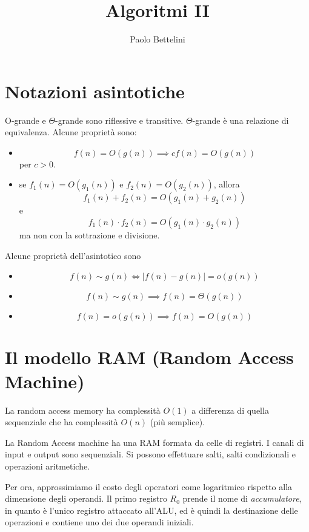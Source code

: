 \documentclass[a4paper]{article}
\title{Algoritmi II}
\author{Paolo Bettelini}
\date{}
\begin{document}
\maketitle
\tableofcontents

\section{Notazioni asintotiche}

O-grande e \(\Theta\)-grande sono riflessive e transitive.
\(\Theta\)-grande è una relazione di equivalenza.
Alcune proprietà sono:
\begin{itemize}
    \item \[
        f(n) = O(g(n)) \implies cf(n) = O(g(n))
    \]
    per \(c>0\).
    \item se \(f_1(n) = O(g_1(n))\) e \(f_2(n) = O(g_2(n))\), allora
    \[
        f_1(n) + f_2(n) = O(g_1(n) + g_2(n))
    \]
    e
    \[
        f_1(n) \cdot f_2(n) = O(g_1(n) \cdot g_2(n))
    \]
    ma non con la sottrazione e divisione.
\end{itemize}


Alcune proprietà dell'asintotico sono

\begin{itemize}
    \item \[
        f(n) \sim g(n) \iff |f(n) - g(n)| = o(g(n))
    \]
    \item \[
        f(n) \sim g(n) \implies f(n) = \Theta(g(n))
    \]
    \item \[
        f(n) = o(g(n)) \implies f(n) = O(g(n))
    \]
\end{itemize}

\section{Il modello RAM (Random Access Machine)}

La random access memory ha complessità \(O(1)\) a differenza di quella sequenziale che
ha complessità \(O(n)\) (più semplice).

La Random Access machine ha una RAM formata da celle di registri.
I canali di input e output sono sequenziali. Si possono effettuare salti, salti condizionali e operazioni aritmetiche.

Per ora, approssimiamo il costo degli operatori come logaritmico rispetto alla dimensione
degli operandi. Il primo registro \(R_0\) prende il nome di \emph{accumulatore},
in quanto è l'unico registro attaccato all'ALU, ed è quindi la destinazione delle operazioni e
contiene uno dei due operandi iniziali.


\end{document}
